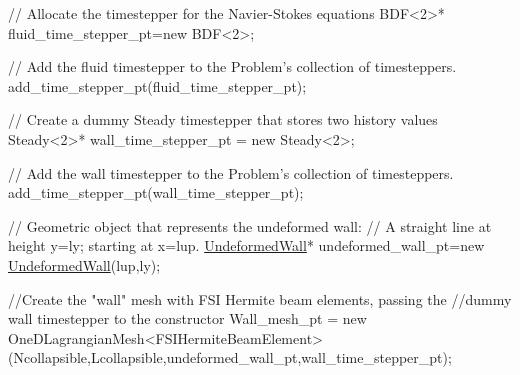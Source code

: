  
\begin{DoxyCodeInclude}
 \textcolor{comment}{// Allocate the timestepper for the Navier-Stokes equations}
 BDF<2>* fluid\_time\_stepper\_pt=\textcolor{keyword}{new} BDF<2>;

 \textcolor{comment}{// Add the fluid timestepper to the Problem's collection of timesteppers.}
 add\_time\_stepper\_pt(fluid\_time\_stepper\_pt);

 \textcolor{comment}{// Create a dummy Steady timestepper that stores two history values}
 Steady<2>* wall\_time\_stepper\_pt = \textcolor{keyword}{new} Steady<2>;

 \textcolor{comment}{// Add the wall timestepper to the Problem's collection of timesteppers.}
 add\_time\_stepper\_pt(wall\_time\_stepper\_pt);

 \textcolor{comment}{// Geometric object that represents the undeformed wall: }
 \textcolor{comment}{// A straight line at height y=ly; starting at x=lup.}
 \hyperlink{classUndeformedWall}{UndeformedWall}* undeformed\_wall\_pt=\textcolor{keyword}{new} \hyperlink{classUndeformedWall}{UndeformedWall}(lup,ly);

 \textcolor{comment}{//Create the "wall" mesh with FSI Hermite beam elements, passing the}
 \textcolor{comment}{//dummy wall timestepper to the constructor}
 Wall\_mesh\_pt = \textcolor{keyword}{new} OneDLagrangianMesh<FSIHermiteBeamElement>
  (Ncollapsible,Lcollapsible,undeformed\_wall\_pt,wall\_time\_stepper\_pt);

\end{DoxyCodeInclude}




 


